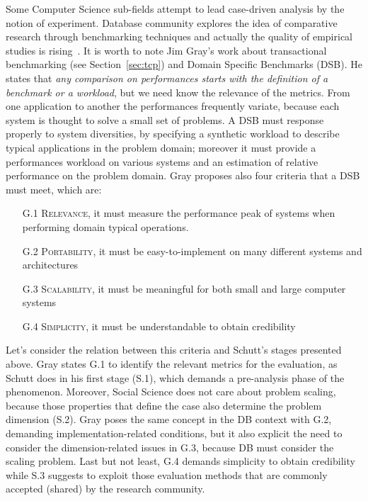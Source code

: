 Some Computer Science sub-fields attempt to lead case-driven analysis by the notion of experiment. Database community explores the idea of comparative research through benchmarking techniques and actually the quality of empirical studies is rising~\cite{Wainer:2009:EEC:1518331.1518552}. It is worth to note Jim Gray's work about transactional benchmarking (see Section~\ref{sec:tcp}) and Domain Specific Benchmarks (DSB). He states that \textit{any comparison on performances starts with the definition of a benchmark or a workload}, but we need know the relevance of the metrics. From one application to another the performances frequently variate, because each system is thought to solve a small set of problems. A DSB must response properly to system diversities, by specifying a synthetic workload to describe typical applications in the problem domain; moreover it must provide a performances workload on various systems and an estimation of relative performance on the problem domain.
Gray proposes also four criteria that a DSB must meet, which are:
\begin{enumerate}
\item[G.1] \textsc{Relevance}, it must measure the performance peak of systems when
performing domain typical operations.
\item[G.2] \textsc{Portability}, it must be easy-to-implement on many different systems and architectures
\item[G.3] \textsc{Scalability}, it must be meaningful for both small and large computer systems
\item[G.4] \textsc{Simplicity}, it must be understandable to obtain credibility
\end{enumerate} 

Let's consider the relation between this criteria and Schutt's stages presented above. Gray states G.1 to identify the relevant metrics for the evaluation, as Schutt does in his first stage (S.1), which demands a pre-analysis phase of the phenomenon. Moreover, Social Science does not care about problem scaling, because those properties that define the case also determine the problem dimension (S.2). Gray poses the same concept in the DB context with G.2, demanding implementation-related conditions, but it also explicit the need to consider the dimension-related issues in G.3, because DB must consider the scaling problem. Last but not least, G.4 demands simplicity to obtain credibility while S.3 suggests to exploit those evaluation methods that are commonly accepted (shared) by the research community. 

